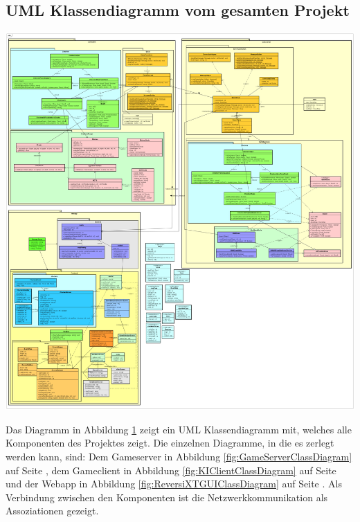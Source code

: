 \documentclass[12pt,a4paper,bibliography=totocnumbered,listof=totocnumbered]{article}
\begin{document}
\begin{appendix}
\section{UML Klassendiagramm vom gesamten Projekt}
\label{apx:AllClassDiagrams}
\vspace{1em}
\begin{minipage}{\linewidth}
	\centering
	\includegraphics[width=1.0\linewidth]{pics/AllClassDiagrams.png}
\end{minipage}

\pagebreak

Das Diagramm in Abbildung \ref{apx:AllClassDiagrams} zeigt ein UML Klassendiagramm mit, welches alle Komponenten des Projektes zeigt.
Die einzelnen Diagramme, in die es zerlegt werden kann, sind: Dem Gameserver in Abbildung \ref{fig:GameServerClassDiagram} auf Seite \pageref{fig:GameServerClassDiagram},
dem Gameclient in Abbildung \ref{fig:KIClientClassDiagram} auf Seite \pageref{fig:KIClientClassDiagram} und der Webapp in Abbildung \ref{fig:ReversiXTGUIClassDiagram}
auf Seite \pageref{fig:ReversiXTGUIClassDiagram}. Als Verbindung zwischen den Komponenten ist die Netzwerkkommunikation als Assoziationen gezeigt. 


\end{appendix}
\end{document}
